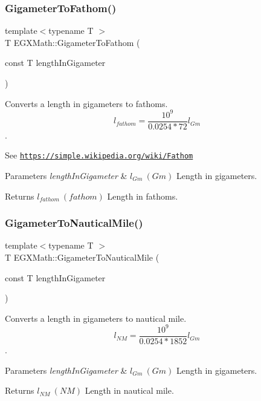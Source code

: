 \subsubsection{\texorpdfstring{Gigameter\+To\+Fathom()}{GigameterToFathom()}}
{\footnotesize\ttfamily template$<$typename T $>$ \\
T E\+G\+X\+Math\+::\+Gigameter\+To\+Fathom (\begin{DoxyParamCaption}\item[{const T}]{length\+In\+Gigameter }\end{DoxyParamCaption})}



Converts a length in gigameters to fathoms. \[ l_{fathom}= \frac{10^{9}}{0.0254 * 72} l_{Gm} \]. 

See \href{https://simple.wikipedia.org/wiki/Fathom}{\tt https\+://simple.\+wikipedia.\+org/wiki/\+Fathom} 
\begin{DoxyParams}{Parameters}
{\em length\+In\+Gigameter} & $ l_{Gm}\ (Gm)$ Length in gigameters. \\
\hline
\end{DoxyParams}
\begin{DoxyReturn}{Returns}
$ l_{fathom}\ (fathom)$ Length in fathoms. 
\end{DoxyReturn}
\mbox{\label{group___e_g_x_math-_conversions-_length_conversions-_gigameter-_nautical_ga52d7a5290f284cdfec247ba606967867}} 
\subsubsection{\texorpdfstring{Gigameter\+To\+Nautical\+Mile()}{GigameterToNauticalMile()}}
{\footnotesize\ttfamily template$<$typename T $>$ \\
T E\+G\+X\+Math\+::\+Gigameter\+To\+Nautical\+Mile (\begin{DoxyParamCaption}\item[{const T}]{length\+In\+Gigameter }\end{DoxyParamCaption})}



Converts a length in gigameters to nautical mile. \[ l_{NM}= \frac{10^{9}}{0.0254 * 1852} l_{Gm} \]. 


\begin{DoxyParams}{Parameters}
{\em length\+In\+Gigameter} & $ l_{Gm}\ (Gm)$ Length in gigameters. \\
\hline
\end{DoxyParams}
\begin{DoxyReturn}{Returns}
$ l_{NM}\ (NM)$ Length in nautical mile. 
\end{DoxyReturn}
